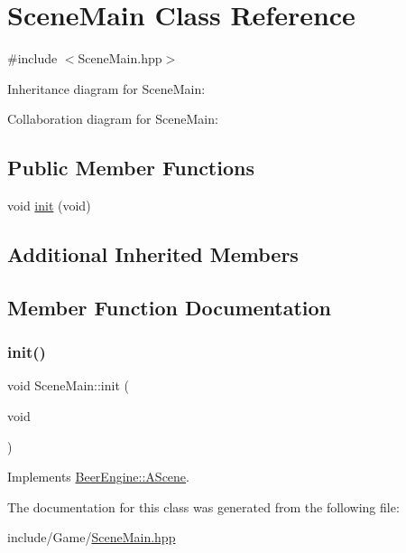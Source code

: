 \hypertarget{class_scene_main}{}\section{Scene\+Main Class Reference}
\label{class_scene_main}


{\ttfamily \#include $<$Scene\+Main.\+hpp$>$}



Inheritance diagram for Scene\+Main\+:


Collaboration diagram for Scene\+Main\+:
\subsection*{Public Member Functions}
\begin{DoxyCompactItemize}
\item 
void \mbox{\hyperlink{class_scene_main_a4406dc5cf9807edcf360ba416de928e2}{init}} (void)
\end{DoxyCompactItemize}
\subsection*{Additional Inherited Members}


\subsection{Member Function Documentation}
\mbox{\label{class_scene_main_a4406dc5cf9807edcf360ba416de928e2}} 
\subsubsection{\texorpdfstring{init()}{init()}}
{\footnotesize\ttfamily void Scene\+Main\+::init (\begin{DoxyParamCaption}\item[{void}]{ }\end{DoxyParamCaption})\hspace{0.3cm}{\ttfamily [virtual]}}



Implements \mbox{\hyperlink{class_beer_engine_1_1_a_scene_a7a55b4e506ae618e6596ae812ad48db0}{Beer\+Engine\+::\+A\+Scene}}.



The documentation for this class was generated from the following file\+:\begin{DoxyCompactItemize}
\item 
include/\+Game/\mbox{\hyperlink{_scene_main_8hpp}{Scene\+Main.\+hpp}}\end{DoxyCompactItemize}
